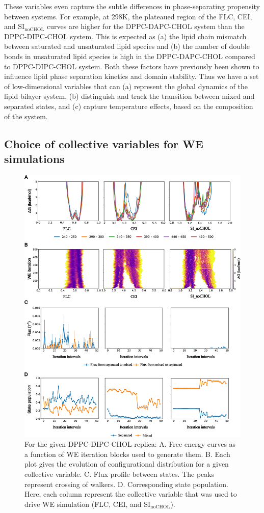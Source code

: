 \documentclass{biophys-new}
\begin{document}
These variables even capture the subtle differences in phase-separating propensity between systems.
For example, at 298K, the plateaued region of the FLC, CEI, and $\text{SI}_{\text{noCHOL}}$ curves are higher for the DPPC-DAPC-CHOL system than the DPPC-DIPC-CHOL system.
This is expected as (a) the lipid chain mismatch between saturated and unsaturated lipid species and (b) the number of double bonds in unsaturated lipid species is high in the DPPC-DAPC-CHOL compared to DPPC-DIPC-CHOL system.
Both these factors have previously been shown to influence lipid phase separation kinetics and domain stability\cite{Fowler2016, Lin2016}.
Thus we have a set of low-dimensional variables that can (a) represent the global dynamics of the lipid bilayer system,
(b) distinguish and track the transition between mixed and separated states, and (c) capture temperature effects,
based on the composition of the system.

\subsection*{Choice of collective variables for WE simulations}

\begin{figure}[hbt!]
\centering
\includegraphics[width=6.5in]{Figures/Main/4/placeholder1.jpg}
\caption{For the given DPPC-DIPC-CHOL replica: A. Free energy curves as a function of WE iteration blocks used to generate them. B. Each plot gives the evolution of configurational distribution for a given collective variable. C. Flux profile between states. The peaks represent crossing of walkers. D. Corresponding state population. Here, each column represent the collective variable that was used to drive WE simulation (FLC, CEI, and $\text{SI}_{\text{noCHOL}}$).}
\label{figs4:view}
\end{figure}
\end{document}
